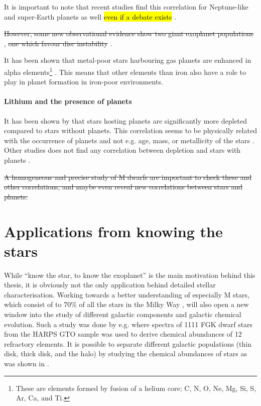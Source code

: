 It is important to note that recent studies find this correlation for Neptune-like and super-Earth
planets as well \citep{Adibekyan2012a,Wang2015,Zhu2016} \hl{even if a debate exists}
\citep{Buchhave2012,Sousa2011}.

\st{However, some new observational evidence show two giant exoplanet populations} \citep{Santos2017},
\st{one which favour disc instability} \citep[see e.g.][]{Nayakshin2017}.

It has been shown that metal-poor stars harbouring gas planets are enhanced in alpha
elements\footnote{These are elements formed by fusion of a helium core; C, N, O, Ne, Mg, Si, S, Ar,
Ca, and Ti.} \citep[see e.g.][]{Adibekyan2012a}. This means that other elements than iron also have
a role to play in planet formation in iron-poor environments.


\paragraph{Lithium and the presence of planets}

It has been shown by \citet{Israelian2004,Delgado2014,Figueira2014a,Gonzalez2015,Takeda2005} that
stars hosting planets are significantly more  depleted compared to stars without planets.
This correlation seems to be physically related with the occurrence of planets and not e.g. age,
mass, or metallicity of the stars \citep{Sousa2010}. Other studies does not find any correlation
between  depletion and stars with planets \citep{Baumann2010,Ramirez2012}.

\st{A homogeneous and precise study of M dwarfs are important to check these and other correlations,
and maybe even reveal new correlations between stars and planets.}

\section{Applications from knowing the stars}
\label{sec:stars_application}

While ``know the star, to know the exoplanet'' is the main motivation behind this thesis, it is
obviously not the only application behind detailed stellar characterisation. Working towards a
better understanding of especially M stars, which consist of to 70\% of all the stars in the Milky
Way \citep{Bochanski2010}, will also open a new window into the study of different galactic
components and galactic chemical evolution. Such a study was done by e.g.
\citet{Adibekyan2012,Delgado2017} where spectra of 1111 FGK dwarf stars from the HARPS GTO sample
was used to derive chemical abundances of 12 refractory elements. It is possible to separate
different galactic populations (thin disk, thick disk, and the halo) by studying the chemical
abundances of stars as was shown in \citet{Adibekyan2012}.

